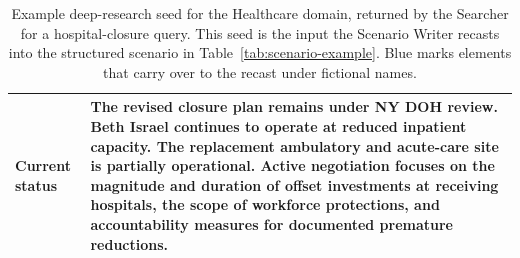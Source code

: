 \documentclass{llmxive}
\begin{document}
\begin{table}[p]
\begin{tabularx}{\textwidth}{@{}l X@{}}
\midrule
\textbf{Current status} &
The revised closure plan remains under NY DOH review. Beth Israel continues to operate at reduced inpatient capacity. The replacement ambulatory and acute-care site is partially operational. Active negotiation focuses on the magnitude and duration of offset investments at receiving hospitals, the scope of workforce protections, and accountability measures for documented premature reductions. \\
\bottomrule
\end{tabularx}
\caption{Example deep-research seed for the Healthcare domain, returned by the Searcher for a hospital-closure query. This seed is the input the Scenario Writer recasts into the structured scenario in Table~\ref{tab:scenario-example}. Blue marks elements that carry over to the recast under fictional names.}
\label{tab:seed-example}
\end{table}
\end{document}
